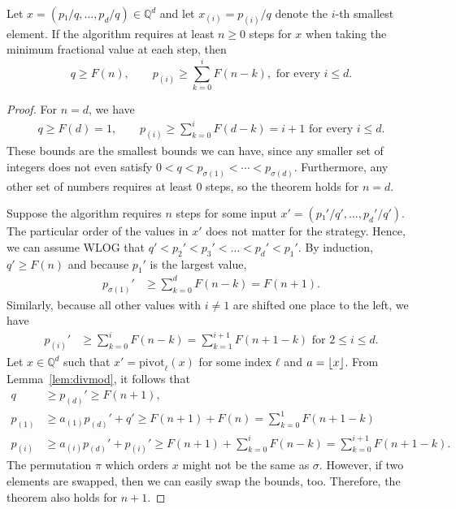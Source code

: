 \begin{theorem}
  Let $x = (p₁/q, …, p_d/q) ∈ ℚ^d$
  and let $x_{(i)} = p_{(i)}/q$ denote the $i$-th smallest element.
  If the algorithm requires at least $n ≥ 0$ steps for $x$ when taking the
  minimum fractional value at each step, then
  \[
    q ≥ F(n),
    \qquad
    p_{(i)} ≥ \sum_{k = 0}^i F(n - k),
    \text{ for every } i ≤ d.
  \]
\end{theorem}

\begin{proof}
  For $n = d$, we have
  \begin{align*}
    q ≥ F(d) = 1,
    \qquad
    p_{(i)} ≥ \sum_{k=0}^i F(d - k) = i + 1 \text{ for every } i ≤ d.
  \end{align*}
  These bounds are the smallest bounds we can have, since any smaller set of
  integers does not even satisfy $0 < q < p_{σ(1)} < ⋯ < p_{σ(d)}$.
  Furthermore, any other set of numbers requires at least $0$ steps, so
  the theorem holds for $n = d$.

  Suppose the algorithm requires $n$ steps for some input $x' = (p₁'/q', …, p_d'/q')$.
  The particular order of the values in $x'$ does not matter for the strategy.
  Hence, we can assume WLOG that $q' < p_2' < p_3' < … < p_d' < p_1'$.
  By induction, $q' ≥ F(n)$ and because $p_1'$ is the largest value,
  \begin{align*}
    p_{σ(1)}' & ≥ \sum_{k=0}^d F(n - k) = F(n + 1).
  \end{align*}
  Similarly, because all other values with $i ≠ 1$ are shifted one place to the
  left, we have
  \begin{align*}
    p_{(i)}' & ≥ \sum_{k=0}^i F(n - k) = \sum_{k=1}^{i+1} F(n + 1 - k) \text{ for } 2 ≤ i ≤ d.
  \end{align*}
  Let $x ∈ ℚ^d$ such that $x' = \mathrm{pivot}_ℓ(x)$ for some index $ℓ$ and $a = \lfloor x\rfloor$.
  From Lemma~\ref{lem:divmod}, it follows that
  \begin{align*}
    q
    & ≥ p_{(d)}' ≥ F(n+1), \\
    p_{(1)}
    & ≥ a_{(1)} p_{(d)}' + q' ≥ F(n + 1) + F(n) = \sum_{k=0}^1 F(n + 1 - k) \\
    p_{(i)}
    & ≥ a_{(i)} p_{(d)}' + p_{(i)}' ≥ F(n + 1) + ∑_{k=0}^i F(n - k) = ∑_{k=0}^{i+1} F(n + 1 - k).
  \end{align*}
  The permutation $π$ which orders $x$ might not be the same as $σ$.
  However, if two elements are swapped, then we can easily swap the bounds, too.
  Therefore, the theorem also holds for $n+1$.
\end{proof}

